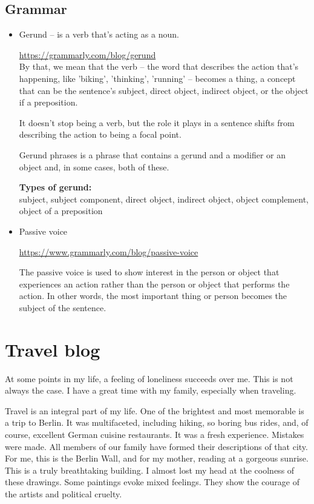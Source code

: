 \documentclass[12pt, a4paper]{article}
\begin{document}
\subsection{Grammar}
\begin{itemize}
    \item Gerund -- is a verb that's acting as a noun.
    
    \url{https://grammarly.com/blog/gerund} \\
    
    By that, we mean that the verb -- the word that describes the action that's happening, like 'biking', 'thinking', 'running' -- becomes a thing, a concept that can be the sentence's subject, direct object, indirect object, or the object if a preposition. 
    
    It doesn't stop being a verb, but the role it plays in a sentence shifts from describing the action to being a focal point.
    
    Gerund phrases is a phrase that contains a gerund and a modifier or an object and, in some cases, both of these.
    
    \textbf{Types of gerund:} \\
    subject, subject component, direct object, indirect object, object complement, object of a preposition
    
    \item Passive voice
    
    \url{https://www.grammarly.com/blog/passive-voice}
    
    The passive voice is used to show interest in the person or object that experiences an action rather than the person or object that performs the action. In other words, the most important thing or person becomes the subject of the sentence.
\end{itemize}

\newpage

\section{Travel blog}

At some points in my life, a feeling of loneliness succeeds over me. This is not always the case. I have a great time with my family, especially when traveling.

Travel is an integral part of my life. One of the brightest and most memorable is a trip to Berlin. It was multifaceted, including hiking, so boring bus rides, and, of course, excellent German cuisine restaurants. It was a fresh experience. Mistakes were made. All members of our family have formed their descriptions of that city. For me, this is the Berlin Wall, and for my mother, reading at a gorgeous sunrise. This is a truly breathtaking building. I almost lost my head at the coolness of these drawings. Some paintings evoke mixed feelings. They show the courage of the artists and political cruelty.
\end{document}
